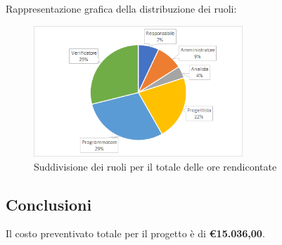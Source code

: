 			Rappresentazione grafica della distribuzione dei ruoli:
			\begin{figure}[h]
				\centering
				\includegraphics[width=0.7\textwidth]{./res/img/totaleRendicontate_pe.png}
				\caption{Suddivisione dei ruoli per il totale delle ore rendicontate}
			\end{figure}
			
\subsection{Conclusioni}
		Il costo preventivato totale per il progetto è di \textbf{\euro15.036,00}.
	
	
	
	
	
	
	
	
	
	
	
	
	
	
	
	
	
